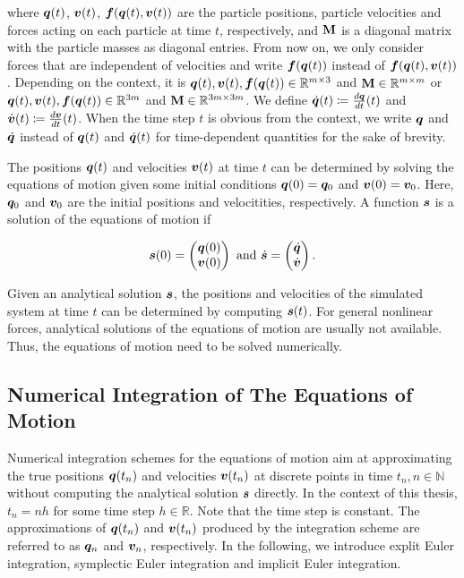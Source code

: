 \noindent where $\bm{q}(t)$, $\bm{v}(t)$, $\bm{f}(\bm{q}(t), \bm{v}(t))$ are the particle positions, particle velocities and 
forces acting on each particle at time $t$, respectively, and $\mathbf{M}$ is a diagonal matrix with the particle masses as diagonal entries. 
From now on, we only consider forces that are independent of velocities and write $\bm{f}(\bm{q}(t))$ instead of 
$\bm{f}(\bm{q}(t), \bm{v}(t))$. Depending on the context, it is
$\bm{q}(t), \bm{v}(t), \bm{f}(\bm{q}(t)) \in \mathbb{R}^{m \times 3}$ and $\mathbf{M} \in \mathbb{R}^{m \times m}$ or 
$\bm{q}(t), \bm{v}(t), \bm{f}(\bm{q}(t)) \in \mathbb{R}^{3m}$ and $\mathbf{M} 
\in \mathbb{R}^{3m \times 3m}$. We define $\dot{\bm{q}}(t) \coloneqq \frac{d\bm{q}}{dt}(t)$ and $\dot{\bm{v}}(t) \coloneqq 
\frac{d\bm{v}}{dt}(t)$. When the time step $t$ is obvious from the context, we write $\bm{q}$ and $\dot{\bm{q}}$ instead of 
$\bm{q}(t)$ and $\dot{\bm{q}}(t)$ for time-dependent quantities for the sake of brevity.

The positions $\bm{q}(t)$ and velocities $\bm{v}(t)$ at time $t$ can be determined by solving the equations of motion given some initial conditions
$\bm{q}(0) = \bm{q}_0$ and $\bm{v}(0) = \bm{v}_0$. Here, $\bm{q}_0$ and $\bm{v}_0$ are the initial positions and velocitities, respectively. 
A function $\bm{s}$ is a solution of the equations of motion if 

\[
    \bm{s}(0) = 
    \begin{pmatrix}
        \bm{q}(0)\\
        \bm{v}(0)
    \end{pmatrix} 
    \text{ and } 
    \dot{\bm{s}} = 
    \begin{pmatrix}
        \dot{\bm{q}}\\
        \dot{\bm{v}}
    \end{pmatrix}.
\]

\noindent Given an analytical solution $\bm{s}$, the positions and velocities of the simulated system at time $t$ can be determined by computing 
$\bm{s}(t)$. For general nonlinear forces, analytical solutions of the equations of motion are usually not available. Thus, the equations of motion 
need to be solved numerically.

\subsection{Numerical Integration of The Equations of Motion}\label{ss:numerical-integration}
Numerical integration schemes for the equations of motion aim at approximating the true positions $\bm{q}(t_n)$ and velocities $\bm{v}(t_n)$ 
at discrete points in time $t_n, n \in \mathbb{N}$ without computing the analytical solution $\bm{s}$ directly. In the context of this 
thesis, $t_n = nh$ for some time step $h \in \mathbb{R}$. Note that the time step is constant. The approximations of $\bm{q}(t_n)$ 
and $\bm{v}(t_n)$ produced by the integration scheme are referred to as $\bm{q}_n$ and $\bm{v}_n$, respectively. In the following, we introduce 
explit Euler integration, symplectic Euler integration and implicit Euler integration.

